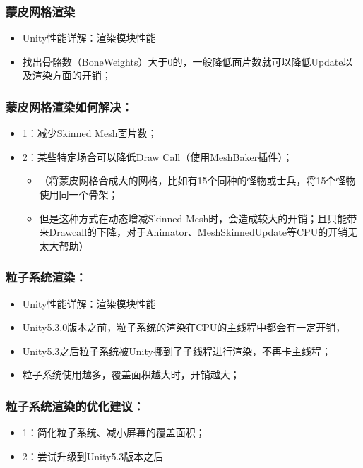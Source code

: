 \documentclass[9pt, b5paper]{article}
\begin{document}
\subsubsection{蒙皮网格渲染}
\label{sec:orgbae73e4}
\begin{itemize}
\item Unity性能详解：渲染模块性能
\item 找出骨骼数（BoneWeights）大于0的，一般降低面片数就可以降低Update以及渲染方面的开销；
\end{itemize}
\subsubsection{蒙皮网格渲染如何解决：}
\label{sec:org5021f47}
\begin{itemize}
\item 1：减少Skinned Mesh面片数；
\item 2：某些特定场合可以降低Draw Call（使用MeshBaker插件）；
\begin{itemize}
\item （将蒙皮网格合成大的网格，比如有15个同种的怪物或士兵，将15个怪物使用同一个骨架；
\item 但是这种方式在动态增减Skinned Mesh时，会造成较大的开销；且只能带来Drawcall的下降，对于Animator、MeshSkinnedUpdate等CPU的开销无太大帮助）
\end{itemize}
\end{itemize}
\subsubsection{粒子系统渲染：}
\label{sec:org2feeafa}
\begin{itemize}
\item Unity性能详解：渲染模块性能
\item Unity5.3.0版本之前，粒子系统的渲染在CPU的主线程中都会有一定开销，
\item Unity5.3之后粒子系统被Unity挪到了子线程进行渲染，不再卡主线程；
\item 粒子系统使用越多，覆盖面积越大时，开销越大；
\end{itemize}
\subsubsection{粒子系统渲染的优化建议：}
\label{sec:orgadc9508}
\begin{itemize}
\item 1：简化粒子系统、减小屏幕的覆盖面积；
\item 2：尝试升级到Unity5.3版本之后
\end{itemize}
\end{document}
